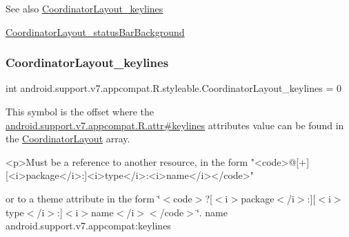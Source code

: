 \begin{DoxySeeAlso}{See also}
\hyperlink{classandroid_1_1support_1_1v7_1_1appcompat_1_1R_1_1styleable_ade8ef8741049ad76bd5e90b20b187b41}{Coordinator\+Layout\+\_\+keylines} 

\hyperlink{classandroid_1_1support_1_1v7_1_1appcompat_1_1R_1_1styleable_a3cac0ac0b4683f1615bfd53649866096}{Coordinator\+Layout\+\_\+status\+Bar\+Background} 
\end{DoxySeeAlso}
\mbox{\label{classandroid_1_1support_1_1v7_1_1appcompat_1_1R_1_1styleable_ade8ef8741049ad76bd5e90b20b187b41}} 
\subsubsection{\texorpdfstring{Coordinator\+Layout\+\_\+keylines}{CoordinatorLayout\_keylines}}
{\footnotesize\ttfamily int android.\+support.\+v7.\+appcompat.\+R.\+styleable.\+Coordinator\+Layout\+\_\+keylines = 0\hspace{0.3cm}{\ttfamily [static]}}

This symbol is the offset where the \hyperlink{classandroid_1_1support_1_1v7_1_1appcompat_1_1R_1_1attr_a96514f8a1e5f958fbf3a5ef892543368}{android.\+support.\+v7.\+appcompat.\+R.\+attr\#keylines} attribute\textquotesingle{}s value can be found in the \hyperlink{classandroid_1_1support_1_1v7_1_1appcompat_1_1R_1_1styleable_a36909bd71e5ee18cc73ff4732b601a79}{Coordinator\+Layout} array.

\begin{DoxyVerb}      <p>Must be a reference to another resource, in the form "<code>@[+][<i>package</i>:]<i>type</i>:<i>name</i></code>"
\end{DoxyVerb}
 or to a theme attribute in the form \char`\"{}$<$code$>$?\mbox{[}$<$i$>$package$<$/i$>$\+:\mbox{]}\mbox{[}$<$i$>$type$<$/i$>$\+:\mbox{]}$<$i$>$name$<$/i$>$$<$/code$>$\char`\"{}.  name android.\+support.\+v7.\+appcompat\+:keylines \mbox{\label{classandroid_1_1support_1_1v7_1_1appcompat_1_1R_1_1styleable_aa327c121de57ab2e57c054fff5f5c980}} 
